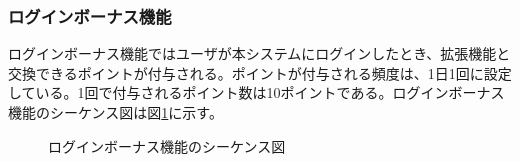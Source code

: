 \documentclass[a4j]{jarticle}
\begin{document}
    \subsubsection{ログインボーナス機能}
    ログインボーナス機能ではユーザが本システムにログインしたとき、拡張機能と交換できるポイントが付与される。ポイントが付与される頻度は、1日1回に設定している。1回で付与されるポイント数は10ポイントである。ログインボーナス機能のシーケンス図は図\ref{fig:login_login-bonus.png}に示す。
    \begin{figure}[H]
\centering
{}
\caption{ログインボーナス機能のシーケンス図}
\label{fig:login_login-bonus.png}
\end{figure}
\end{document}
